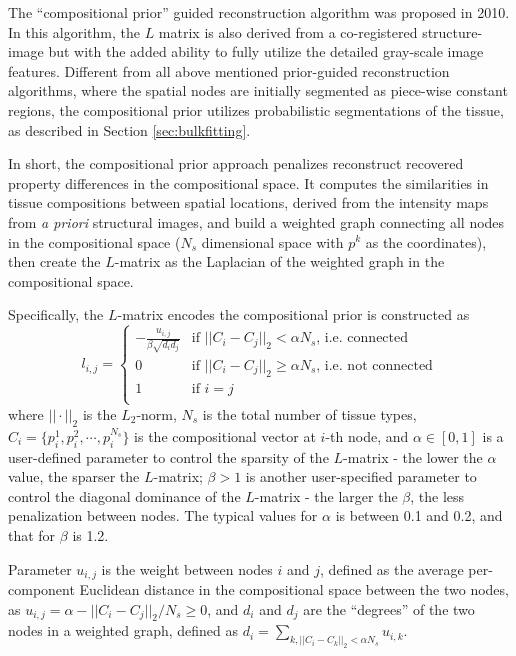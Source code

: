 \documentclass{article}
\begin{document}
The ``compositional prior'' guided reconstruction algorithm was proposed in 2010. In this algorithm, the $L$ matrix is also derived from a co-registered structure-image but with the added ability to fully utilize the detailed gray-scale image features. Different from all above mentioned prior-guided reconstruction algorithms, where the spatial nodes are initially segmented as piece-wise constant regions, the compositional prior utilizes probabilistic segmentations of the tissue, as described in Section \ref{sec:bulkfitting}. 

In short, the compositional prior approach penalizes reconstruct recovered property differences in the compositional space. It
computes the similarities in tissue compositions between spatial locations, derived from the intensity maps from \emph{a priori} structural images, and build a weighted graph connecting all nodes in the compositional space ($N_s$ dimensional space with $p^k$ as the coordinates), then create the $L$-matrix as the Laplacian of the weighted graph in the compositional space.

Specifically, the $L$-matrix encodes the compositional prior is constructed as
\begin{equation}
l_{i,j}=\left\{\begin{array}{cl}
-\frac{u_{i,j}}{\beta\sqrt{d_id_j}}& \textrm{if $||C_i-C_j||_2<\alpha N_s$, i.e. connected}\\
0 &\textrm{if $||C_i-C_j||_2\ge\alpha N_s$, i.e. not connected}\\
1 & \textrm{if $i=j$}\\
\end{array}\right.
\end{equation}
where $||\cdot||_2$ is the $L_2$-norm, $N_s$ is the total number of tissue types, $C_i=\{p^1_i,p^2_i,\cdots,p^{N_s}_i\}$ is the compositional vector at $i$-th node, and $\alpha\in[0, 1]$ is a user-defined parameter to control the sparsity of the $L$-matrix - the lower the $\alpha$ value, the sparser the $L$-matrix; $\beta>1$ is another user-specified parameter to control the diagonal dominance of the $L$-matrix - the larger the $\beta$, the less penalization between nodes. The typical values for $\alpha$ is between 0.1 and 0.2, and that for $\beta$ is 1.2. 

Parameter $u_{i,j}$ is the weight between nodes $i$ and $j$, defined as the average per-component Euclidean distance in the compositional space between the two nodes, as $u_{i,j}=\alpha-||C_i-C_j||_2/N_s\ge 0$, and $d_i$ and $d_j$ are the ``degrees'' of the two nodes in a weighted graph, defined as $d_i=\sum_{k,||C_i-C_k||_2<\alpha N_s}{u_{i,k}}$.
\end{document}
